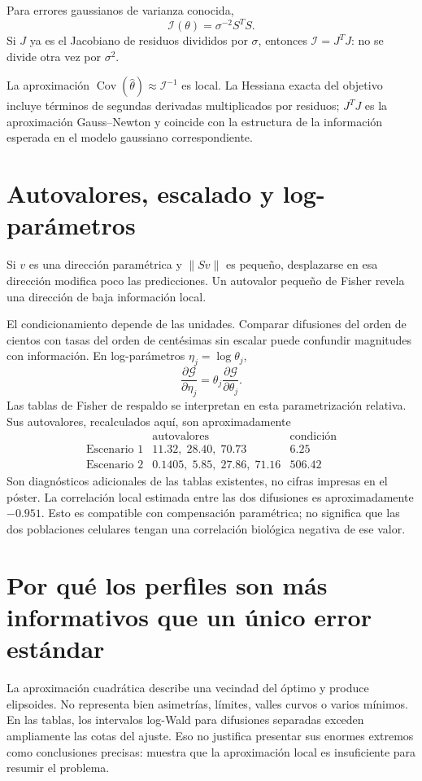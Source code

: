 \documentclass[11pt,a4paper]{report}
\begin{document}
Para errores gaussianos de varianza conocida,
\[
\mathcal I(\theta)=\sigma^{-2}S^TS.
\]
Si $J$ ya es el Jacobiano de residuos divididos por $\sigma$, entonces $\mathcal I=J^TJ$: no se divide otra vez por $\sigma^2$.

La aproximación $\operatorname{Cov}(\widehat\theta)\approx\mathcal I^{-1}$ es local. La Hessiana exacta del objetivo incluye términos de segundas derivadas multiplicados por residuos; $J^TJ$ es la aproximación Gauss--Newton y coincide con la estructura de la información esperada en el modelo gaussiano correspondiente.

\section{Autovalores, escalado y log-parámetros}
Si $v$ es una dirección paramétrica y $\|Sv\|$ es pequeño, desplazarse en esa dirección modifica poco las predicciones. Un autovalor pequeño de Fisher revela una dirección de baja información local.

El condicionamiento depende de las unidades. Comparar difusiones del orden de cientos con tasas del orden de centésimas sin escalar puede confundir magnitudes con información. En log-parámetros $\eta_j=\log\theta_j$,
\[
\frac{\partial\mathcal G}{\partial\eta_j}=\theta_j\frac{\partial\mathcal G}{\partial\theta_j}.
\]
Las tablas de Fisher de respaldo se interpretan en esta parametrización relativa. Sus autovalores, recalculados aquí, son aproximadamente
\[
\begin{array}{c|l|r}
&\text{autovalores}&\text{condición}\\\hline
\text{Escenario 1}&11.32,\;28.40,\;70.73&6.25\\
\text{Escenario 2}&0.1405,\;5.85,\;27.86,\;71.16&506.42
\end{array}
\]
Son diagnósticos adicionales de las tablas existentes, no cifras impresas en el póster. La correlación local estimada entre las dos difusiones es aproximadamente $-0.951$. Esto es compatible con compensación paramétrica; no significa que las dos poblaciones celulares tengan una correlación biológica negativa de ese valor.

\section{Por qué los perfiles son más informativos que un único error estándar}
La aproximación cuadrática describe una vecindad del óptimo y produce elipsoides. No representa bien asimetrías, límites, valles curvos o varios mínimos. En las tablas, los intervalos log-Wald para difusiones separadas exceden ampliamente las cotas del ajuste. Eso no justifica presentar sus enormes extremos como conclusiones precisas: muestra que la aproximación local es insuficiente para resumir el problema.
\end{document}
